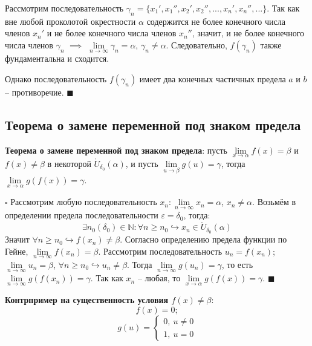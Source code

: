 \documentclass[12pt, a4paper, reqno]{article}
\begin{document}
    Рассмотрим последовательность $\gamma_n = \{x_{1}', x_{1}'', x_{2}', x_{2}'', ..., x_{n}',
    x_{n}'', ...\}$. Так как вне любой проколотой окрестности $\alpha$ содержится не более конечного
    числа членов $x_{n}'$ и не более конечного числа членов $x_{n}''$, значит, и не более конечного
    числа членов $\gamma_n$ $\implies$ $\lim\limits_{n\to\infty} \gamma_n = \alpha$, $\gamma_n \neq
    \alpha$. Следовательно, $f(\gamma_n)$ также фундаментальна и сходится.

    Однако последовательность $f(\gamma_n)$ имеет два конечных частичных предела $a$ и $b$ --
    противоречие. $\blacksquare$

\subsection{Теорема о замене переменной под знаком предела}

    \textbf{Теорема о замене переменной под знаком предела}: пусть $\lim\limits_{x\to\alpha} f(x) =
    \beta$ и $f(x) \neq \beta$ в некоторой $\mathring U_{\delta_0}(\alpha)$, и пусть
    $\lim\limits_{u\to\beta} g(u) = \gamma$, тогда $\lim\limits_{x\to\alpha} g(f(x)) = \gamma$.

    $\square$ Рассмотрим любую последовательность $x_n: \lim\limits_{n\to\infty} x_n = \alpha$,
    $x_n \neq \alpha$. Возьмём в определении предела последовательности $\varepsilon = \delta_0$,
    тогда:
    \begin{equation*}
        \exists n_0(\delta_0)\in\mathbb{N}: \forall n\geq n_0\hookrightarrow x_n\in \mathring
        U_{\delta_0}(\alpha)
    \end{equation*}
    Значит $\forall n\geq n_0\hookrightarrow f(x_n) \neq \beta$. Согласно определению предела
    функции по Гейне, $\lim\limits_{n\to\infty} f(x_n) = \beta$. Рассмотрим последовательность
    $u_n = f(x_n)$; $\lim\limits_{n\to\infty} u_n = \beta$, $\forall n\geq n_0\hookrightarrow u_n
    \neq \beta$. Тогда $\lim\limits_{n\to\infty}g(u_n) = \gamma$, то есть
    $\lim\limits_{n\to\infty}g(f(x_n)) = \gamma$. Так как $x_n$ -- любая, то
    $\lim\limits_{x\to\alpha}g(f(x)) = \gamma$. $\blacksquare$

    \textbf{Контрпример на существенность условия $f(x) \neq \beta$}:
    \begin{equation*}
        f(x) = 0;
    \end{equation*}
    \begin{equation*}
        g(u) =
        \begin{cases}
            0,\ u\neq 0 \\
            1,\ u = 0
        \end{cases}
    \end{equation*}
\end{document}
